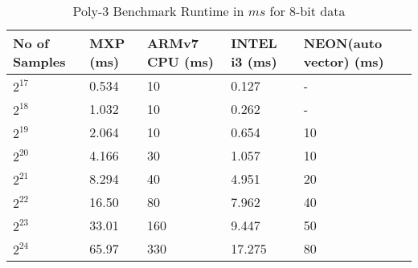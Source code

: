\begin{table}[htbp]
	\centering
	\begin{adjustbox}{width=.9\textwidth}
		\small
	\begin{tabular}{lllll}
		\toprule
		\textbf{No of Samples} & \textbf{MXP (ms)} & \textbf{ARMv7 CPU (ms)} & \textbf{INTEL i3 (ms)} & \textbf{NEON(auto vector) (ms)} \\
		\midrule
		$2^{17}$ & 0.534 & 10 & 0.127 & - \\
		$2^{18}$ & 1.032 & 10 & 0.262 & - \\
		$2^{19}$ & 2.064 & 10 & 0.654 & 10 \\
		$2^{20}$ & 4.166 & 30 & 1.057 & 10 \\
		$2^{21}$ & 8.294 & 40 & 4.951 & 20 \\
		$2^{22}$ & 16.50 & 80 & 7.962 & 40 \\
		$2^{23}$ & 33.01 & 160 & 9.447 & 50 \\
		$2^{24}$ & 65.97 & 330 & 17.275 & 80 \\
		
		\bottomrule
	\end{tabular}%
     \end{adjustbox}%
      \caption{Poly-3 Benchmark Runtime in $ms$ for 8-bit data}
	\label{y:21}%
\end{table}%
